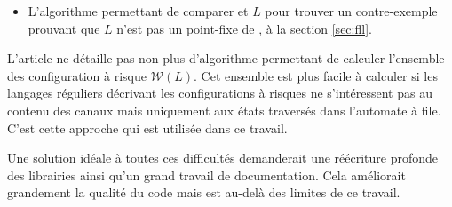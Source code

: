 \begin{itemize}
\begin{itemize}
    \item L'algorithme permettant de comparer \fl et $L$ pour trouver un contre-exemple prouvant que $L$ n'est pas un point-fixe de \fl, à la section \ref{sec:fll}.
  \end{itemize}
  L'article ne détaille pas non plus d'algorithme permettant de calculer l'ensemble des configuration à risque $\mathcal{W}(L)$. Cet ensemble est plus facile à calculer si les langages réguliers décrivant les configurations à risques ne s'intéressent pas au contenu des canaux mais uniquement aux états traversés dans l'automate à file. C'est cette approche qui est utilisée dans ce travail.  
\end{itemize}

Une solution idéale à toutes ces difficultés demanderait une réécriture profonde des librairies ainsi qu'un grand travail de documentation. Cela améliorait grandement la qualité du code mais est au-delà des limites de ce travail.
